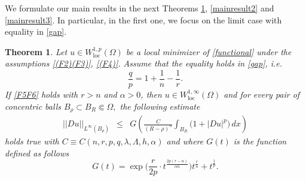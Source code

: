 \documentclass[12pt]{amsart}
\newtheorem{theorem}{Theorem}[section]
\theoremstyle{definition}
\numberwithin{equation}{section}
\numberwithin{equation}{section}
\begin{document}
{%

We formulate our main results in the next Theorems \ref{mainresult},  \ref{mainresult2} and \ref{mainresult3}. In particular, in the first one, we focus on the limit case with equality in \eqref{gap}.

\begin{theorem}
\label{mainresult}
    Let $u\in W^{1,p}_{\mathrm{loc}}(\Omega)$ be a local minimizer of \eqref{functional} under the assumptions \eqref{(F2)(F3)}, \eqref{(F4)}.
  Assume that  the equality holds in \eqref{gap}, i.e. 
   \begin{equation}\label{definitionr}
      \frac{q}{p} = 1+\frac{1}{n}-\frac{1}{r}.  
    \end{equation} 
 If \eqref{F5F6} holds  with  $r>n$ and $\alpha>0$, 
%
then $u\in W^{1,\infty}_{\mathrm{loc}}(\Omega)$ and for every pair of concentric balls $B_\rho\subset B_R\Subset\Omega,$ the following estimate
 \begin{eqnarray}
     \label{mainaptotale}
||Du||_{L^{\infty}(B_{\rho})} &\le& G\left(\!\frac{C}{( R - \rho )^{n}}  \int_{B_{R}} \!\!\Big(1 + |Du|^p \Big)
\, dx\right)
\end{eqnarray}
holds true  with $C \equiv C(n, r, p, q, \lambda, \Lambda, h, \alpha)$ and where %
$G(t)$ is the function defined as follows
\begin{equation}
\label{DefinizioneG}
G(t)=
\exp\Big(\frac{r}{2p}\cdot t^{\frac{2p(r-n)}{\alpha n}}\Big)t^{\frac{r}{n}} + t^{\frac{1}{p}}. %
\end{equation}
 \end{theorem}

}
\end{document}
